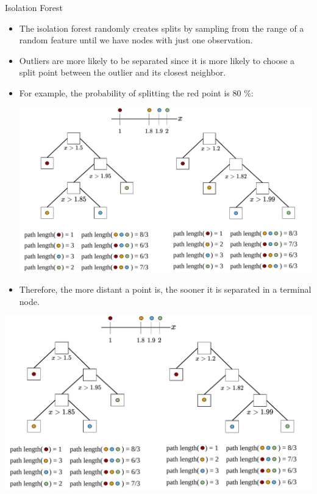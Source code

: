 \begin{vbframe}{Isolation Forest}
    \begin{itemize}
        \item The isolation forest randomly creates splits by sampling from the range of a random feature until we have nodes with just one observation.
        \item Outliers are more likely to be separated since it is more likely to choose a split point between the outlier and its closest neighbor.
        \item For example, the probability of splitting the red point is 80 \%:
              \begin{center}
                  \includegraphics[width=\textwidth, page=3, trim=0cm 12cm 0cm 0cm]{figure_man/isolation_forest.pdf}
              \end{center}
        \item Therefore, the more distant a point is, the sooner it is separated in a terminal node.
    \end{itemize}
    \framebreak
    
    \begin{center}
        \includegraphics[width=\textwidth, page=1]{figure_man/isolation_forest.pdf}
    \end{center}
    \framebreak
    

\end{vbframe}

